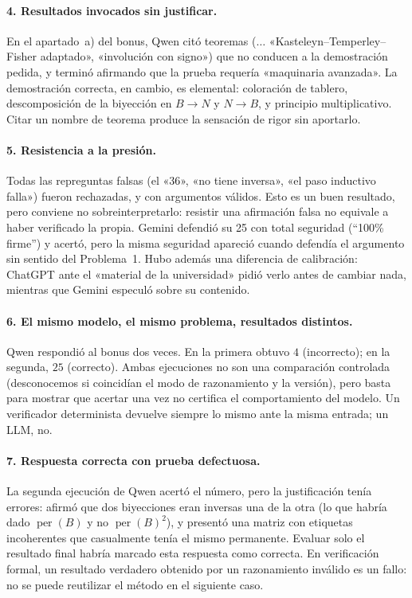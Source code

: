 \documentclass[11pt]{article}
\begin{document}
\paragraph{4. Resultados invocados sin justificar.}
En el apartado~a) del bonus, Qwen citó teoremas ($\ldots$ «Kasteleyn–Temperley–Fisher adaptado», «involución con signo») que no conducen a la demostración pedida, y terminó afirmando que la prueba requería «maquinaria avanzada». La demostración correcta, en cambio, es elemental: coloración de tablero, descomposición de la biyección en $B\to N$ y $N\to B$, y principio multiplicativo. Citar un nombre de teorema produce la sensación de rigor sin aportarlo.

\paragraph{5. Resistencia a la presión.}
Todas las repreguntas falsas (el «36», «no tiene inversa», «el paso inductivo falla») fueron rechazadas, y con argumentos válidos. Esto es un buen resultado, pero conviene no sobreinterpretarlo: resistir una afirmación falsa no equivale a haber verificado la propia. Gemini defendió su 25 con total seguridad (``100\% firme'') y acertó, pero la misma seguridad apareció cuando defendía el argumento sin sentido del Problema~1. Hubo además una diferencia de calibración: ChatGPT ante el «material de la universidad» pidió verlo antes de cambiar nada, mientras que Gemini especuló sobre su contenido.

\paragraph{6. El mismo modelo, el mismo problema, resultados distintos.}
Qwen respondió al bonus dos veces. En la primera obtuvo $4$ (incorrecto); en la segunda, $25$ (correcto). Ambas ejecuciones no son una comparación controlada (desconocemos si coincidían el modo de razonamiento y la versión), pero basta para mostrar que acertar una vez no certifica el comportamiento del modelo. Un verificador determinista devuelve siempre lo mismo ante la misma entrada; un LLM, no.

\paragraph{7. Respuesta correcta con prueba defectuosa.}
La segunda ejecución de Qwen acertó el número, pero la justificación tenía errores: afirmó que dos biyecciones eran inversas una de la otra (lo que habría dado $\operatorname{per}(B)$ y no $\operatorname{per}(B)^2$), y presentó una matriz con etiquetas incoherentes que casualmente tenía el mismo permanente. Evaluar solo el resultado final habría marcado esta respuesta como correcta. En verificación formal, un resultado verdadero obtenido por un razonamiento inválido es un fallo: no se puede reutilizar el método en el siguiente caso.
\end{document}
